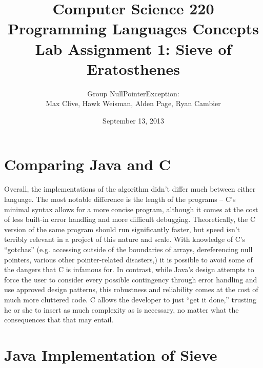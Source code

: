 \documentclass[a4paper,11pt]{article}
\title{Computer Science 220 \\[20pt]
Programming Languages Concepts\\ [20pt]
\textbf{Lab Assignment 1: Sieve of Eratosthenes}}
\author{Group NullPointerException: \\ Max Clive, Hawk Weisman, Alden Page, Ryan Cambier}
\date{September 13, 2013 }
\begin{document}
\maketitle

\section{Comparing Java and C}

		Overall, the implementations of the algorithm didn't differ much between either language. The most notable difference is the length of the programs – C's minimal syntax allows for a more concise program, although it comes at the cost of less built-in error handling and more difficult debugging. Theoretically, the C version of the same program should run significantly faster, but speed isn't terribly relevant in a project of this nature and scale.
	With knowledge of C's “gotchas” (e.g. accessing outside of the boundaries of arrays, dereferencing null pointers, various other pointer-related disasters,) it is possible to avoid some of the dangers that C is infamous for.
	In contrast, while Java's design attempts to force the user to consider every possible contingency through error handling and use approved design patterns, this robustness and reliability comes at the cost of much more cluttered code. C allows the developer to just “get it done,” trusting he or she to insert as much complexity as is necessary, no matter what the consequences that that may entail.

\section{Java Implementation of Sieve}
\end{document}
